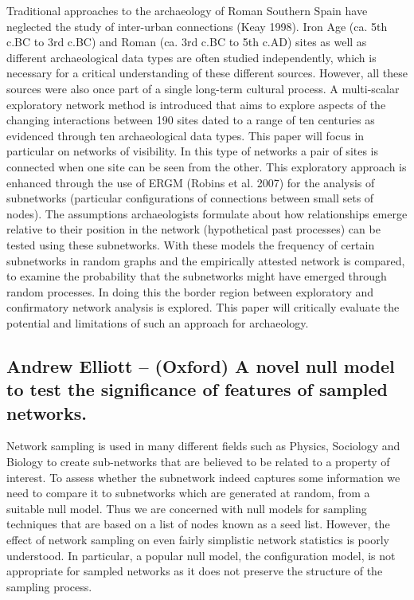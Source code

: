 \documentclass[10pt]{article}
\begin{document}
\begin{multicols}{2}
Traditional approaches to the archaeology of Roman Southern Spain have neglected the study of inter-urban connections (Keay 1998). Iron Age (ca. 5th c.BC to 3rd c.BC) and Roman (ca. 3rd c.BC to 5th c.AD) sites as well as different archaeological data types are often studied independently, which is necessary for a critical understanding of these different sources. However, all these sources were also once part of a single long-term cultural process. A multi-scalar exploratory network method is introduced that aims to explore aspects of the changing interactions between 190 sites dated to a range of ten centuries as evidenced through ten archaeological data types. This paper will focus in particular on networks of visibility. In this type of networks a pair of sites is connected when one site can be seen from the other. This exploratory approach is enhanced through the use of ERGM (Robins et al. 2007) for the analysis of subnetworks (particular configurations of connections between small sets of nodes). The assumptions archaeologists formulate about how relationships emerge relative to their position in the network (hypothetical past processes) can be tested using these subnetworks. With these models the frequency of certain subnetworks in random graphs and the empirically attested network is compared, to examine the probability that the subnetworks might have emerged through random processes. In doing this the border region between exploratory and confirmatory network analysis is explored. This paper will critically evaluate the potential and limitations of such an approach for archaeology.

\subsection*{Andrew Elliott – (Oxford) A novel null model to test the significance of features of sampled networks.}

Network sampling is used in many different fields such as Physics, Sociology and Biology to create sub-networks that are believed to be related to a property of interest. To assess whether the subnetwork indeed captures some information we need to compare it to subnetworks which are generated at random, from a suitable null model. Thus we are concerned with null models for sampling techniques that are based on a list of nodes known as a seed list. However, the effect of network sampling on even fairly simplistic network statistics is poorly understood. In particular, a popular null model, the configuration model, is not appropriate for sampled networks as it does not preserve the structure of the sampling process.


\end{multicols}
\end{document}
